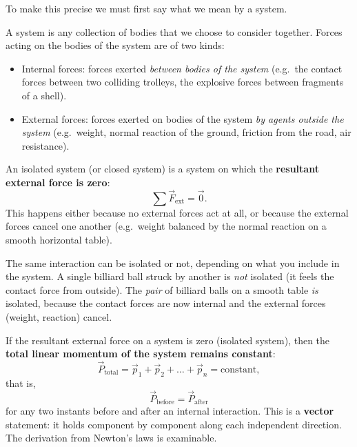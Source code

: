 \documentclass[11pt]{article}
\newcommand{\cle}[1]{{\popxbold\color{popdark}#1}}
\newcounter{popsec}
\newcounter{popsub}
\newcommand{\courssub}[1]{%
  \stepcounter{popsub}%
  \par\vspace{9pt}\noindent{\popxbold\fontsize{11.5}{13}\selectfont\color{popink}{\color{poporange}\thepopsec.\thepopsub}\hspace{6pt}#1}\par\nopagebreak\vspace{4pt}
}
\begin{document}
To make this precise we must first say what we mean by a \cle{system}.

\begin{definition}
A \cle{system} is any collection of bodies that we choose to consider together. Forces acting on the bodies of the system are of two kinds:
\begin{itemize}
\item \cle{Internal forces}: forces exerted \emph{between bodies of the system} (e.g.\ the contact forces between two colliding trolleys, the explosive forces between fragments of a shell).
\item \cle{External forces}: forces exerted on bodies of the system \emph{by agents outside the system} (e.g.\ weight, normal reaction of the ground, friction from the road, air resistance).
\end{itemize}
\end{definition}

\begin{definition}
An \cle{isolated system} (or closed system) is a system on which the \textbf{resultant external force is zero}:
\[
\sum \vec{F}_{\text{ext}} = \vec{0}.
\]
This happens either because no external forces act at all, or because the external forces cancel one another (e.g.\ weight balanced by the normal reaction on a smooth horizontal table).
\end{definition}

\begin{attention}
The same interaction can be isolated or not, depending on what you include in the system. A single billiard ball struck by another is \emph{not} isolated (it feels the contact force from outside). The \emph{pair} of billiard balls on a smooth table \emph{is} isolated, because the contact forces are now internal and the external forces (weight, reaction) cancel.
\end{attention}

\courssub{Statement of the Principle}

\begin{propriete}
If the resultant external force on a system is zero (isolated system), then the \textbf{total linear momentum of the system remains constant}:
\[
\vec{P}_{\text{total}} = \vec{p}_1+\vec{p}_2+\dots+\vec{p}_n = \text{constant},
\]
that is,
\[
\boxed{\;\vec{P}_{\text{before}} = \vec{P}_{\text{after}}\;}
\]
for any two instants before and after an internal interaction. This is a \textbf{vector} statement: it holds component by component along each independent direction. The derivation from Newton's laws is examinable.
\end{propriete}
\end{document}
